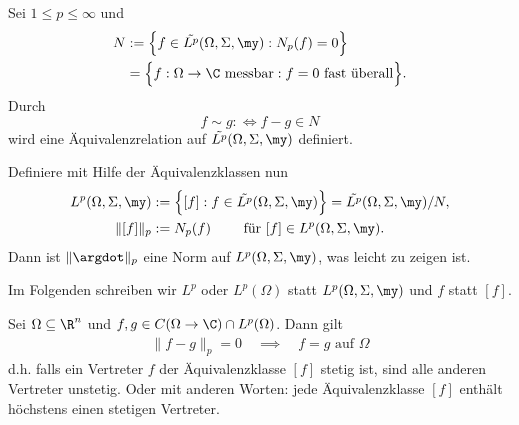 \begin{df} \label{2.10}
	Sei $1 \le p \le \infty$ und
	\begin{align*}
		N &:= \Big\{ f \in \tilde {L^p}(\Omega, \Sigma, \my) : N_p(f) = 0 \Big\} \\
		&= \Big\{ f : \Omega \to \C \text{ messbar} : f = 0 \text{ fast überall} \Big\}.
	\end{align*}
	Durch
	\[
		f \sim g :\iff f-g \in N
	\]
	wird eine Äquivalenzrelation auf $\tilde{L^p}(\Omega, \Sigma, \my)$ definiert.

	Definiere mit Hilfe der Äquivalenzklassen nun
	\begin{align*}
		L^p(\Omega, \Sigma, \my)
			&:= \Big\{ [f] : f \in \tilde{L^p}(\Omega, \Sigma, \my) \Big\}
			= \tilde {L^p} (\Omega, \Sigma, \my) / N, \\
		\| [f] \|_p &:= N_p(f) \qquad \text{ für } [f] \in L^p(\Omega, \Sigma, \my).
	\end{align*}
	Dann ist $\|\argdot\|_p$ eine Norm auf $L^p(\Omega, \Sigma, \my)$, was leicht zu zeigen ist.

	Im Folgenden schreiben wir $L^p$ oder $L^p(\Omega)$ statt $L^p(\Omega, \Sigma, \my)$ und $f$ statt $[f]$.
\end{df}

\begin{nt} \label{2.11}
	Sei $\Omega \subset \R^n$ und $f,g \in C(\Omega \to \C) \cap L^p(\Omega)$.
	Dann gilt
	\begin{align*}
		\|f - g \|_p = 0
		\quad\implies\quad
		f = g \text{ auf $\Omega$}
	\end{align*}
	d.h. falls ein Vertreter $f$ der Äquivalenzklasse $[f]$ stetig ist, sind alle anderen Vertreter unstetig.
	Oder mit anderen Worten: jede Äquivalenzklasse $[f]$ enthält höchstens einen stetigen Vertreter.
\end{nt}


